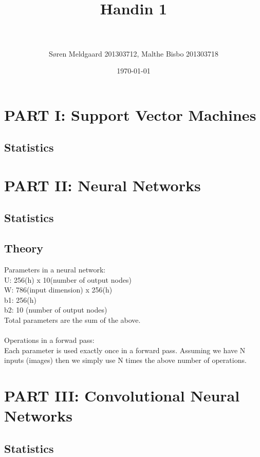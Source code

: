 \documentclass[paper=a4, fontsize=11pt]{scrartcl} %
\title{	
\normalfont \normalsize 
\horrule{0.5pt} \\[0.4cm] %
\huge Handin 1 \\ %
\horrule{2pt} \\[0.5cm] %
}
\author{S\o ren Meldgaard 201303712, Malthe Bisbo 201303718} %
\date{\normalsize\today} %
\numberwithin{equation}{section} %
\numberwithin{figure}{section} %
\numberwithin{table}{section} %
\begin{document}
\maketitle %

\section{PART I: Support Vector Machines}

\subsection{Statistics}

\section{PART II: Neural Networks}

\subsection{Statistics}

\subsection{Theory}

Parameters in a neural network: \\
U: 256(h) x 10(number of output nodes) \\
W: 786(input dimension) x 256(h) \\
b1: 256(h) \\
b2: 10 (number of output nodes) \\
Total parameters are the sum of the above. \\ \\

Operations in a forwad pass: \\
Each parameter is used exactly once in a forward pass. Assuming we have N inputs (images) then we simply use N times the above number of operations.

\section{PART III: Convolutional Neural Networks}

\subsection{Statistics}
\end{document}

